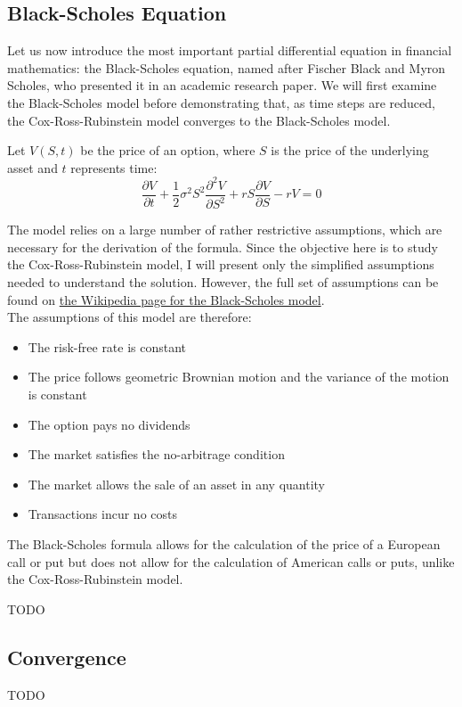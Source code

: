 \newpage

\subsection{Black-Scholes Equation}
Let us now introduce the most important partial differential equation in financial mathematics: the Black-Scholes equation, named after Fischer Black and Myron Scholes, who presented it in an academic research paper. We will first examine the Black-Scholes model before demonstrating that, as time steps are reduced, the Cox-Ross-Rubinstein model converges to the Black-Scholes model.

\vspace{0.05\textheight}
\begin{definitionbox}[frametitle = {Black-Scholes-Merton Partial Differential Equation}]
Let $V(S,t)$ be the price of an option, where $S$ is the price of the underlying asset and $t$ represents time:
$$\frac{\partial V}{\partial t} + \frac{1}{2}\sigma^2S^2\frac{\partial^2V}{\partial S^2}+rS\frac{\partial V}{\partial S}-rV=0$$ \cite{ModeleDeBlackScholes}
\end{definitionbox}
\vspace{0.05\textheight}
The model relies on a large number of rather restrictive assumptions, which are necessary for the derivation of the formula. Since the objective here is to study the Cox-Ross-Rubinstein model, I will present only the simplified assumptions needed to understand the solution. However, the full set of assumptions can be found on \hyperlink{https://fr.wikipedia.org/wiki/Modèle_Black-Scholes}{the Wikipedia page for the Black-Scholes model}. \vspace{0.025\textheight}\\
The assumptions of this model are therefore:
\begin{itemize}
\item The risk-free rate is constant
\item The price follows geometric Brownian motion and the variance of the motion is constant
\item The option pays no dividends
\item The market satisfies the no-arbitrage condition
\item The market allows the sale of an asset in any quantity
\item Transactions incur no costs
\end{itemize}
\vspace{0.025\textheight}
The Black-Scholes formula allows for the calculation of the price of a European call or put but does not allow for the calculation of American calls or puts, unlike the Cox-Ross-Rubinstein model.




TODO
\cite{TDBlackScholes}

\subsection{Convergence}

TODO
